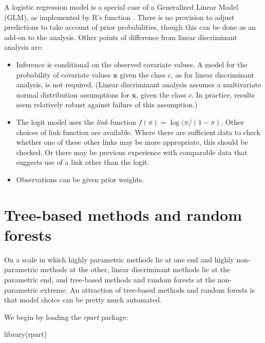 A logistic regression model is a special case of a Generalized
Linear Model (GLM), as implemented by R's function . 
There is no provision to adjust predictions to take account of
prior probabilities, though this can be done as an add-on to the analysis.
Other points of difference from linear discriminant analysis are:

\begin{itemize}
\item Inference is conditional on the observed covariate values. A model
  for the probability of covariate values $\mathbf{x}$ given the class
  $c$, as for linear discriminant analysis, is not required.
  (Linear discriminant analysis assumes a multivariate normal distribution
  assumptions for $\mathbf{x}$, given the class $c$. In practice, results
  seem relatively robust against failure of this assumption.)
\item The logit model uses the {\em link} function $f(\pi) =
  \log(\pi/(1-\pi)$. Other choices of link function are available.
  Where there are sufficient data to check whether one of these other
  links may be more appropriate, this should be checked.  Or there may
  be previous experience with comparable data that suggests use of a
  link other than the logit.
\item Observations can be given prior weights.
\end{itemize}

\section{Tree-based methods and random forests}
On a scale in which highly parametric methods lie at one end and
highly non-parametric methods at the other, linear discriminant
methods lie at the parametric end, and tree-based methods and random
forests at the non-parametric extreme.  An attraction of tree-based
methods and random forests is that model choice can be pretty much
automated.

We begin by loading the {\em rpart} package:
\begin{Schunk}
\begin{Sinput}
library(rpart)
\end{Sinput}
\end{Schunk}

